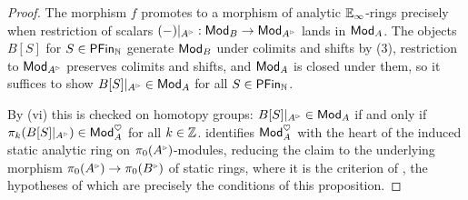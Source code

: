 \begin{proof}
    The morphism $f$ promotes to a morphism of analytic $\mathbb{E}_{\infty}$-rings precisely when restriction of scalars $(-)|_{A^{\tri}}:\Mod_{B}\to\Mod_{A^{\tri}}$ lands in $\mathsf{Mod}_{A}$. The objects $B[S]$ for $S\in\mathsf{PFin}_{\mathbb{N}}$ generate $\mathsf{Mod}_{B}$ under colimits and shifts by  (3), restriction to $\Mod_{A^{\tri}}$ preserves colimits and shifts, and $\mathsf{Mod}_{A}$ is closed under them, so it suffices to show $B[S]|_{A^{\tri}}\in\Mod_{A}$ for all $S\in\mathsf{PFin}_{\mathbb{N}}$.

    By  (vi) this is checked on homotopy groups: $B[S]|_{A^{\tri}}\in\Mod_{A}$ if and only if $\pi_{k}(B[S]|_{A^{\tri}})\in\Mod_{A}^{\heartsuit}$ for all $k\in\mathbb{Z}$.  identifies $\mathsf{Mod}_{A}^{\heartsuit}$ with the heart of the induced static analytic ring on $\pi_{0}(A^{\tri})$-modules, reducing the claim to the underlying morphism $\pi_{0}(A^{\tri})\to\pi_{0}(B^{\tri})$ of static rings, where it is the criterion of \cite[Prop. 7.12]{Condensed}, the hypotheses of which are precisely the conditions of this proposition.
\end{proof}
